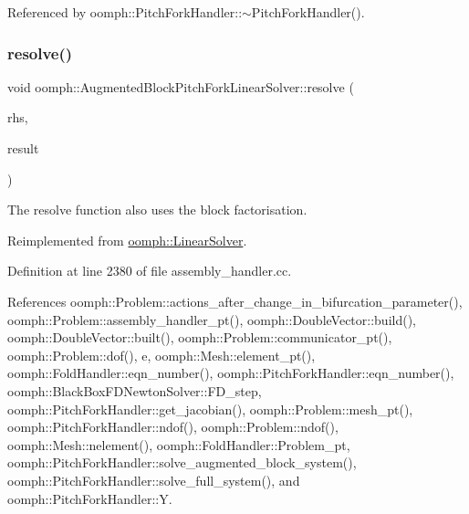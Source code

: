 Referenced by oomph\+::\+Pitch\+Fork\+Handler\+::$\sim$\+Pitch\+Fork\+Handler().

\mbox{\label{classoomph_1_1AugmentedBlockPitchForkLinearSolver_a1d617896a3f1c1b1236ff18dc87ed8d7}} 
\subsubsection{\texorpdfstring{resolve()}{resolve()}}
{\footnotesize\ttfamily void oomph\+::\+Augmented\+Block\+Pitch\+Fork\+Linear\+Solver\+::resolve (\begin{DoxyParamCaption}\item[{const \hyperlink{classoomph_1_1DoubleVector}{Double\+Vector} \&}]{rhs,  }\item[{\hyperlink{classoomph_1_1DoubleVector}{Double\+Vector} \&}]{result }\end{DoxyParamCaption})\hspace{0.3cm}{\ttfamily [virtual]}}



The resolve function also uses the block factorisation. 



Reimplemented from \hyperlink{classoomph_1_1LinearSolver_a3b310d08333033edc119b2a5bd7dcbfb}{oomph\+::\+Linear\+Solver}.



Definition at line 2380 of file assembly\+\_\+handler.\+cc.



References oomph\+::\+Problem\+::actions\+\_\+after\+\_\+change\+\_\+in\+\_\+bifurcation\+\_\+parameter(), oomph\+::\+Problem\+::assembly\+\_\+handler\+\_\+pt(), oomph\+::\+Double\+Vector\+::build(), oomph\+::\+Double\+Vector\+::built(), oomph\+::\+Problem\+::communicator\+\_\+pt(), oomph\+::\+Problem\+::dof(), e, oomph\+::\+Mesh\+::element\+\_\+pt(), oomph\+::\+Fold\+Handler\+::eqn\+\_\+number(), oomph\+::\+Pitch\+Fork\+Handler\+::eqn\+\_\+number(), oomph\+::\+Black\+Box\+F\+D\+Newton\+Solver\+::\+F\+D\+\_\+step, oomph\+::\+Pitch\+Fork\+Handler\+::get\+\_\+jacobian(), oomph\+::\+Problem\+::mesh\+\_\+pt(), oomph\+::\+Pitch\+Fork\+Handler\+::ndof(), oomph\+::\+Problem\+::ndof(), oomph\+::\+Mesh\+::nelement(), oomph\+::\+Fold\+Handler\+::\+Problem\+\_\+pt, oomph\+::\+Pitch\+Fork\+Handler\+::solve\+\_\+augmented\+\_\+block\+\_\+system(), oomph\+::\+Pitch\+Fork\+Handler\+::solve\+\_\+full\+\_\+system(), and oomph\+::\+Pitch\+Fork\+Handler\+::Y.


